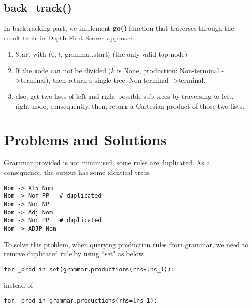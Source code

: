 \documentclass[12pt]{article}
\begin{document}
\subsection{back\_track()}
In backtracking part, we implement \textbf{go()} function that traverses through the result table in Depth-First-Search approach.
\begin{enumerate}
	\item Start with (0, $l$, grammar.start) (the only valid top node)
	\item If the node can not be divided ($k$ is None, production: Non-terminal -\textgreater terminal), then return a single tree: Non-terminal -\textgreater terminal.
	\item else, get two lists of left and right possible sub-trees by traversing to left, right node, consequently, then, return a Cartesian product of those two lists.
\end{enumerate}

\section{Problems and Solutions}
Grammar provided is not minimised, some rules are duplicated. As a consequence, the output has some identical trees.
\begin{verbatim}
Nom -> X15 Nom
Nom -> Nom PP	# duplicated
Nom -> Nom NP
Nom -> Adj Nom
Nom -> Nom PP	# duplicated
Nom -> ADJP Nom
\end{verbatim}

To solve this problem, when querying production rules from grammar, we need to remove duplicated rule by using ``set" as below
\begin{verbatim}
for _prod in set(grammar.productions(rhs=lhs_1)):
\end{verbatim}
instead of
\begin{verbatim}
for _prod in grammar.productions(rhs=lhs_1):
\end{verbatim}
\end{document}
